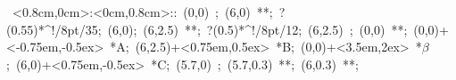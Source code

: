 \hbox{
\xy    <0.8cm,0cm>:<0cm,0.8cm>::
       (0,0) ; (6,0) **\dir{-}; ?(0.55)*^!/8pt/{35};
       (6,0); (6,2.5) **\dir{-}; ?(0.5)*^!/8pt/{12}; 
       (6,2.5) ; (0,0) **\dir{-};  
       (0,0)+<-0.75em,-0.5ex> *{A};
       (6,2.5)+<0.75em,0.5ex> *{B};
       (0,0)+<3.5em,2ex> *\hbox{$\beta$};
       (6,0)+<0.75em,-0.5ex> *{C};
       (5.7,0) ; (5.7,0.3) **\dir{-}; (6,0.3) **\dir{-};       
\endxy}
	   
